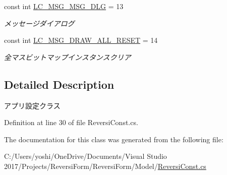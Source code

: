 \begin{DoxyCompactItemize}
\mbox{\label{class_reversi_form_1_1_reversi_const_afcb21d67ed2e163d38d51d4235190a0c}} 
const int \hyperlink{class_reversi_form_1_1_reversi_const_afcb21d67ed2e163d38d51d4235190a0c}{L\+C\+\_\+\+M\+S\+G\+\_\+\+M\+S\+G\+\_\+\+D\+LG} = 13
\begin{DoxyCompactList}\small\item\em メッセージダイアログ \end{DoxyCompactList}\item 
\mbox{\label{class_reversi_form_1_1_reversi_const_a7d19252a69550114ccefe0f69fc3850f}} 
const int \hyperlink{class_reversi_form_1_1_reversi_const_a7d19252a69550114ccefe0f69fc3850f}{L\+C\+\_\+\+M\+S\+G\+\_\+\+D\+R\+A\+W\+\_\+\+A\+L\+L\+\_\+\+R\+E\+S\+ET} = 14
\begin{DoxyCompactList}\small\item\em 全マスビットマップインスタンスクリア \end{DoxyCompactList}\end{DoxyCompactItemize}


\subsection{Detailed Description}
アプリ設定クラス 

Definition at line 30 of file Reversi\+Const.\+cs.



The documentation for this class was generated from the following file\+:\begin{DoxyCompactItemize}
\item 
C\+:/\+Users/yoshi/\+One\+Drive/\+Documents/\+Visual Studio 2017/\+Projects/\+Reversi\+Form/\+Reversi\+Form/\+Model/\hyperlink{_reversi_const_8cs}{Reversi\+Const.\+cs}\end{DoxyCompactItemize}
